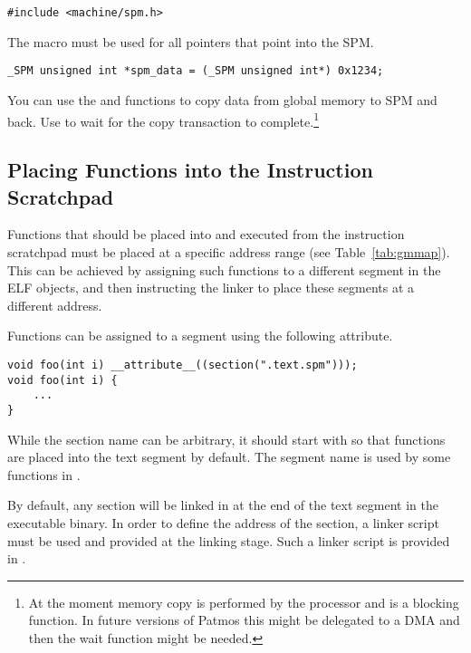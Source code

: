 \begin{verbatim}
#include <machine/spm.h>
\end{verbatim}

The  macro must be used for all pointers that point into the SPM.

\begin{verbatim}
_SPM unsigned int *spm_data = (_SPM unsigned int*) 0x1234;
\end{verbatim}

You can use the  and  functions
to copy data from global memory to SPM and back. Use  to
wait for the copy transaction to complete.\footnote{At the moment memory copy is
performed by the processor and is a blocking function. In future versions of Patmos
this might be delegated to a DMA and then the wait function might be needed.}




\subsection{Placing Functions into the Instruction Scratchpad}

Functions that should be placed into and executed from the instruction scratchpad must be placed at
a specific address range (see Table~\ref{tab:gmmap}). This can be achieved by assigning such functions
to a different segment in the ELF objects, and then instructing the linker to place these segments at
a different address.


Functions can be assigned to a segment using the following attribute.

\begin{verbatim}
void foo(int i) __attribute__((section(".text.spm")));
void foo(int i) {
    ...
}
\end{verbatim}

While the section name can be arbitrary, it should start with  so that functions are placed
into the text segment by default. The  segment name is used by some functions in 
.

By default, any  section will be linked in at the end of the text segment in the executable binary.
In order to define the address of the section, a linker script must be used and provided at the linking stage.
Such a linker script is provided in .


